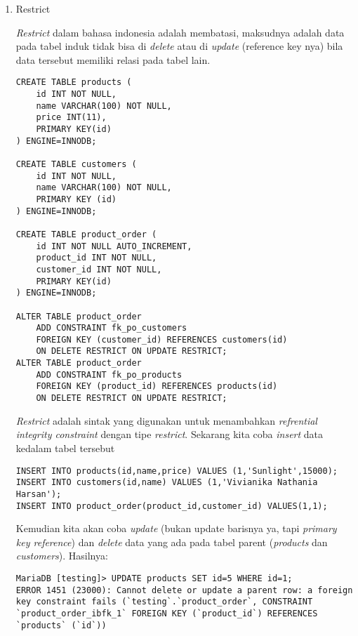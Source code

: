 \documentclass[a4paper]{article}
\begin{document}
\begin{enumerate}
	\item Restrict	

\textit{Restrict} dalam bahasa indonesia adalah membatasi, maksudnya adalah data pada tabel induk tidak bisa di \textit{delete} atau di \textit{update} (reference key nya) bila data tersebut memiliki relasi pada tabel lain.

\begin{lstlisting}
CREATE TABLE products (
    id INT NOT NULL,
    name VARCHAR(100) NOT NULL,
    price INT(11),
    PRIMARY KEY(id)
) ENGINE=INNODB;

CREATE TABLE customers (
    id INT NOT NULL,
    name VARCHAR(100) NOT NULL,
    PRIMARY KEY (id)
) ENGINE=INNODB;

CREATE TABLE product_order (
    id INT NOT NULL AUTO_INCREMENT,
    product_id INT NOT NULL,
    customer_id INT NOT NULL,
    PRIMARY KEY(id)
) ENGINE=INNODB;

ALTER TABLE product_order 
	ADD CONSTRAINT fk_po_customers 
	FOREIGN KEY (customer_id) REFERENCES customers(id)
	ON DELETE RESTRICT ON UPDATE RESTRICT;
ALTER TABLE product_order 
	ADD CONSTRAINT fk_po_products
	FOREIGN KEY (product_id) REFERENCES products(id)
	ON DELETE RESTRICT ON UPDATE RESTRICT;
\end{lstlisting}

\textit{Restrict} adalah sintak yang digunakan untuk menambahkan \textit{refrential integrity constraint} dengan tipe \textit{restrict}. Sekarang kita coba \textit{insert} data kedalam tabel tersebut

\begin{lstlisting}
INSERT INTO products(id,name,price) VALUES (1,'Sunlight',15000);
INSERT INTO customers(id,name) VALUES (1,'Vivianika Nathania Harsan');
INSERT INTO product_order(product_id,customer_id) VALUES(1,1);
\end{lstlisting}

Kemudian kita akan coba  \textit{update} (bukan update barisnya ya, tapi \textit{primary key reference}) dan \textit{delete} data yang ada pada tabel parent (\textit{products} dan \textit{customers}). Hasilnya:

\begin{lstlisting}
MariaDB [testing]> UPDATE products SET id=5 WHERE id=1;
ERROR 1451 (23000): Cannot delete or update a parent row: a foreign key constraint fails (`testing`.`product_order`, CONSTRAINT `product_order_ibfk_1` FOREIGN KEY (`product_id`) REFERENCES `products` (`id`))


\end{lstlisting}
\end{enumerate}
\end{document}
